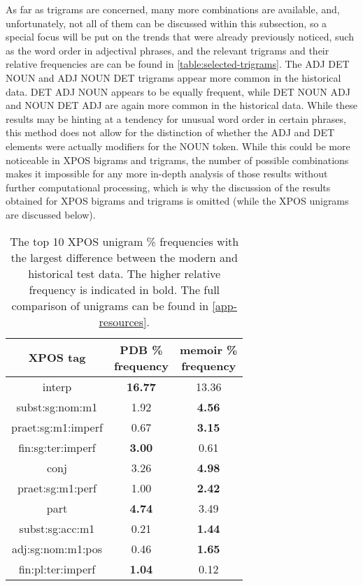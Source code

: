 As far as trigrams are concerned, many more combinations are available, and, unfortunately, not all of them can be discussed within this subsection, so a special focus will be put on the trends that were already previously noticed, such as the word order in adjectival phrases, and the relevant trigrams and their relative frequencies are can be found in \autoref{table:selected-trigrams}. The ADJ DET NOUN and ADJ NOUN DET trigrams appear more common in the historical data. DET ADJ NOUN appears to be equally frequent, while DET NOUN ADJ and NOUN DET ADJ are again more common in the historical data. While these results may be hinting at a tendency for unusual word order in certain phrases, this method does not allow for the distinction of whether the ADJ and DET elements were actually modifiers for the NOUN token. While this could be more noticeable in XPOS bigrams and trigrams, the number of possible combinations makes it impossible for any more in-depth analysis of those results without further computational processing, which is why the discussion of the results obtained for XPOS bigrams and trigrams is omitted (while the XPOS unigrams are discussed below).

\renewcommand{\arraystretch}{1.25}
\begin{table}[H]
\begin{center}
\begin{tabular}{|c|cc|}
\hline \bf XPOS tag & \bf \makecell[c]{PDB \% \\ frequency} & \bf \makecell[c]{memoir \% \\ frequency} \\ \hline
interp & \textbf{16.77} & 13.36 \\
subst:sg:nom:m1 & 1.92 & \textbf{4.56} \\
praet:sg:m1:imperf & 0.67 & \textbf{3.15} \\
fin:sg:ter:imperf & \textbf{3.00} & 0.61 \\
conj & 3.26 & \textbf{4.98} \\
praet:sg:m1:perf & 1.00 & \textbf{2.42} \\
part & \textbf{4.74} & 3.49 \\
subst:sg:acc:m1 & 0.21 & \textbf{1.44} \\
adj:sg:nom:m1:pos & 0.46 & \textbf{1.65} \\
fin:pl:ter:imperf & \textbf{1.04} & 0.12 \\
\hline
\end{tabular}
\caption{\label{table:xpos-unigrams} The top 10 XPOS unigram \% frequencies with the largest difference between the modern and historical test data. The higher relative frequency is indicated in bold. The full comparison of unigrams can be found in \autoref{app-resources}.}
\end{center}
\end{table}

